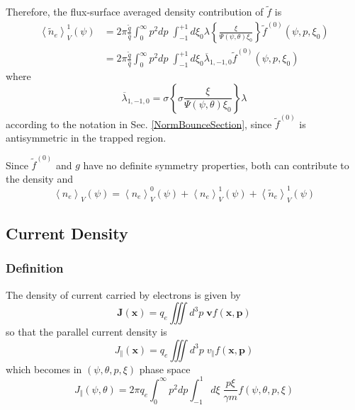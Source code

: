 Therefore, the flux-surface averaged density contribution of $\widetilde{f}$
is
\begin{align}
\left\langle \widetilde{n}_{e}\right\rangle _{V}^{1}\left( \psi\right) &
=2\pi\frac{\widetilde{q}}{\widehat{q}}\int_{0}^{\infty}p^{2}dp\;%
\int_{-1}^{+1}d\xi_{0}\lambda\left\{ \frac{\xi}{\Psi(\psi,\theta)\xi_{0}}
\right\} \widetilde{f}^{(0)}(\psi,p,\xi_{0}) \\
& =2\pi\frac{\widetilde{q}}{\widehat{q}}\int_{0}^{\infty}p^{2}dp\;\int
_{-1}^{+1}d\xi_{0}\overline{\lambda}_{1,-1,0}\widetilde{f}^{(0)}(\psi
,p,\xi_{0})
\end{align}
where
\begin{equation}
\overline{\lambda}_{1,-1,0}=\sigma\left\{ \sigma\frac{\xi}{\Psi(\psi
,\theta)\xi_{0}}\right\} \lambda
\end{equation}
according to the notation in Sec. \ref{NormBounceSection}, since $\widetilde{
f}^{(0)}$ is antisymmetric in the trapped region.

Since $\widetilde{f}^{(0)}$ and $g$ have no definite symmetry properties,
both can contribute to the density and
\begin{equation}
\left\langle n_{e}\right\rangle _{V}\left( \psi\right) =\left\langle
n_{e}\right\rangle _{V}^{0}\left( \psi\right) +\left\langle
n_{e}\right\rangle _{V}^{1}\left( \psi\right) +\left\langle \widetilde{n}%
_{e}\right\rangle _{V}^{1}\left( \psi\right)
\end{equation}

\subsection{Current Density}

\subsubsection{Definition}

The density of current carried by electrons is given by
\begin{equation}
\mathbf{J}\left( \mathbf{x}\right) =q_{e}\iiint d^{3}p\;\mathbf{v}f\left(
\mathbf{x},\mathbf{p}\right)
\end{equation}
so that the parallel current density is
\begin{equation}
J_{\Vert}\left( \mathbf{x}\right) =q_{e}\iiint d^{3}p\;v_{\Vert}f\left(
\mathbf{x},\mathbf{p}\right)
\end{equation}
which becomes in $\left( \psi,\theta,p,\xi\right) $ phase space
\begin{equation}
J_{\Vert}\left( \psi,\theta\right) =2\pi
q_{e}\int_{0}^{\infty}p^{2}dp\int_{-1}^{1}d\xi\;\frac{p\xi}{\gamma m}f\left(
\psi,\theta,p,\xi\right)
\end{equation}

